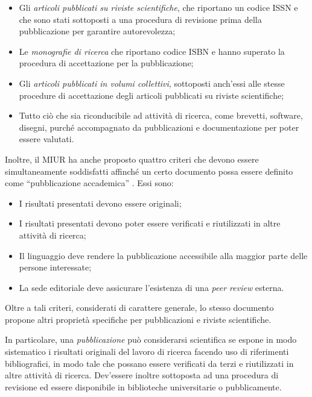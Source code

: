 \begin{itemize}
    \item Gli \textit{articoli pubblicati su riviste scientifiche}, che
    riportano un codice ISSN e che sono stati  sottoposti a una procedura di
    revisione prima della pubblicazione per garantire autorevolezza;
    \item Le \textit{monografie di ricerca} che riportano codice ISBN e hanno
    superato la procedura di  accettazione per la pubblicazione;
    \item Gli \textit{articoli pubblicati in volumi collettivi}, sottoposti
    anch'essi alle stesse procedure di  accettazione degli articoli pubblicati
    su riviste scientifiche;
    \item Tutto ciò che sia riconducibile ad attività di ricerca, come brevetti, software, disegni, 
    purché accompagnato da pubblicazioni e documentazione per poter essere valutati.
\end{itemize}

Inoltre, il MIUR ha anche proposto quattro criteri che devono essere
simultaneamente soddisfatti affinché un certo documento possa essere definito
come ``pubblicazione accademica'' \cite{criteri2013pubblicazioni}.
Essi sono:

\begin{itemize}
    \item I risultati presentati devono essere originali;
    \item I risultati presentati devono poter essere verificati e riutilizzati
    in altre attività di ricerca;
    \item Il linguaggio deve rendere la pubblicazione accessibile alla maggior
    parte delle persone interessate;
    \item La sede editoriale deve assicurare l’esistenza di una \textit{peer review} esterna.
\end{itemize}

Oltre a tali criteri, considerati di carattere generale, lo stesso
documento~\cite{criteri2013pubblicazioni} propone altri proprietà specifiche per
pubblicazioni e riviste scientifiche.

In particolare, una \textit{pubblicazione} può considerarsi scientifica se
espone in modo sistematico i risultati originali del lavoro di ricerca facendo
uso di riferimenti bibliografici, in modo tale che possano essere verificati da
terzi e riutilizzati in altre attività di ricerca.
Dev'essere inoltre sottoposta ad una procedura di revisione ed essere disponibile
in biblioteche universitarie o pubblicamente.

